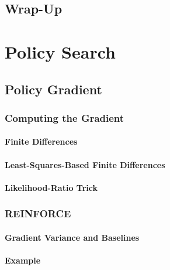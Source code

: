 	\section{Wrap-Up} %

\chapter{Policy Search} %

	\section{Policy Gradient} %

		\subsection{Computing the Gradient} %

			\subsubsection{Finite Differences} %

			\subsubsection{Least-Squares-Based Finite Differences} %

			\subsubsection{Likelihood-Ratio Trick} %

		\subsection{REINFORCE} %

			\subsubsection{Gradient Variance and Baselines} %

			\subsubsection{Example} %

